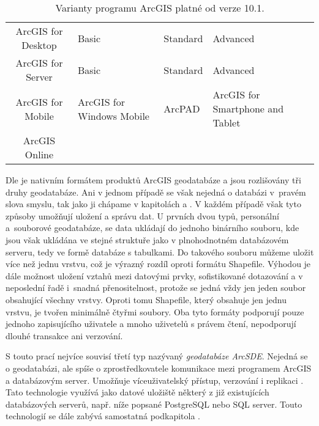   \begin{table}[H]
    \caption{Varianty programu ArcGIS platné od verze 10.1.}
    \label{verzeArcGIS}
    \begin{footnotesize}
      \begin{center}
        \begin{tabular}{|>{\centering} c |>{\centering}m{9.5em}  m{8.5em}  <{\centering} m{11em}  <{\centering}|}
          \hline
          {\bf \color{purpurova7}Produkt}	& \multicolumn{3}{c|}{\bf \color{purpurova7}Verze} \\
          \hline
          ArcGIS for Desktop & Basic & Standard & Advanced \\
            ArcGIS for Server &	Basic &	Standard &	Advanced \\
            ArcGIS for Mobile &	ArcGIS for Windows Mobile &	ArcPAD &	ArcGIS for Smartphone and Tablet \\
              ArcGIS Online   & & &	\\	
          \hline
        \end{tabular}
      \end{center}
    \end{footnotesize}
  \end{table}

Dle \cite{Law2008} je nativním formátem produktů ArcGIS geodatabáze a jsou
roz\-li\-šo\-vá\-ny tři druhy geodatabáze. Ani v jednom případě se však nejedná o
databázi v~pravém slova smyslu, tak jako ji chápame v kapitolách
 a . V každém případě však tyto
způsoby umožňují uložení a správu dat. U prvních dvou typů, personální
a~souborové geodatabáze, se data ukládají do jednoho binárního souboru, kde
jsou však ukládána ve stejné struktuře jako v plnohodnotném databázovém
serveru, tedy ve formě databáze s tabulkami. Do takového souboru můžeme uložit
více než jednu vrstvu, což je výrazný rozdíl oproti formátu Shapefile. Výhodou
je dále možnost uložení vztahů mezi datovými prvky, sofistikované dotazování a
v neposlední řadě i~snadná přenositelnost, protože se jedná vždy jen jeden
soubor obsahující všechny vrstvy. Oproti tomu Shapefile, který obsahuje jen
jednu vrstvu, je tvořen minimálně čtyřmi soubory. Oba tyto formáty podporují pouze
jednoho zapisujícího uživatele a mnoho uživetelů s právem čtení, nepodporují
dlouhé transakce ani verzování.

S touto prací nejvíce souvisí třetí typ nazývaný {\it geodatabáze
ArcSDE}. Nejedná se o geodatabázi, ale spíše o zprostředkovatele
komunikace mezi programem ArcGIS a databázovým server. Umožňuje
víceuživatelský přístup, verzování i replikaci \citep{Esri2006}. Tato
technologie využívá jako datové uložiště některý z již existujících
databázových serverů, např. níže popsané PostgreSQL nebo SQL server.
Touto technologií se dále zabývá samostatná podkapitola .

